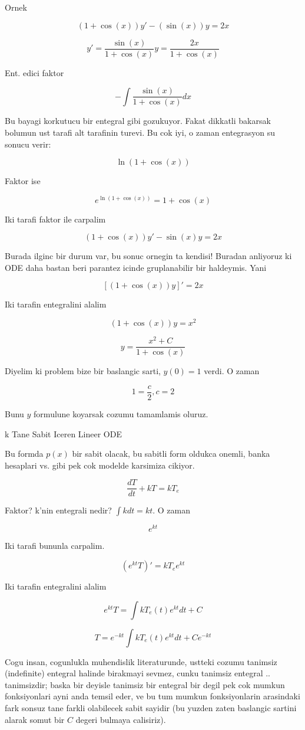\documentclass[12pt,fleqn]{article}\usepackage{../common}
\begin{document}
Ornek 

\[ (1+\cos(x))y' - (\sin(x))y = 2x \]

\[ y' = \frac{\sin(x)}{1+\cos(x)}y = \frac{2x}{1+\cos(x)} \]

Ent. edici faktor

\[ - \int \frac{\sin(x)}{1+\cos(x)} dx \]

Bu bayagi korkutucu bir entegral gibi gozukuyor. Fakat dikkatli
bakarsak bolumun ust tarafi alt tarafinin turevi. Bu cok iyi, o zaman
entegrasyon su sonucu verir:

\[ \ln (1+\cos(x)) \]

Faktor ise

\[ e^{\ln (1+\cos(x))} = 1+\cos(x) \]

Iki tarafi faktor ile carpalim

\[ (1+\cos(x)) y' - \sin(x)y = 2x \]

Burada ilginc bir durum var, bu sonuc ornegin ta kendisi! Buradan
anliyoruz ki ODE daha bastan beri parantez icinde gruplanabilir bir
haldeymis. Yani

\[ [(1+\cos(x))y]' = 2x \]

Iki tarafin entegralini alalim

\[ (1+\cos(x))y = x^2 \]

\[ y = \frac{x^2+C}{1+\cos(x)} \]

Diyelim ki problem bize bir baslangic sarti, $y(0) = 1$ verdi. O zaman

\[ 1=\frac{c}{2}, c=2 \]

Bunu $y$ formulune koyarsak cozumu tamamlamis oluruz. 

k Tane Sabit Iceren Lineer ODE

Bu formda $p(x)$ bir sabit olacak, bu sabitli form oldukca onemli,
banka hesaplari vs. gibi pek cok modelde karsimiza cikiyor.

\[ \frac{dT}{dt} + kT = kT_e \]

Faktor? k'nin entegrali nedir? $\int k dt = kt$. O zaman

\[ e^{kt} \]

Iki tarafi bununla carpalim. 

\[ (e^{kt} T)' = kT_e e^{kt} \]

Iki tarafin entegralini alalim

\[ e^{kt} T = \int kT_e(t) e^{kt}dt + C\]

\[ T = e^{-kt} \int kT_e(t) e^{kt} dt + C e^{-kt} \]

Cogu insan, cogunlukla muhendislik literaturunde, ustteki cozumu
tanimsiz (indefinite) entegral halinde birakmayi sevmez, cunku
tanimsiz entegral .. tanimsizdir; baska bir deyisle tanimsiz bir
entegral bir degil pek cok mumkun fonksiyonlari ayni anda temsil eder,
ve bu tum mumkun fonksiyonlarin arasindaki fark sonsuz tane farkli
olabilecek sabit sayidir (bu yuzden zaten baslangic sartini alarak
somut bir $C$ degeri bulmaya calisiriz). 
\end{document}
